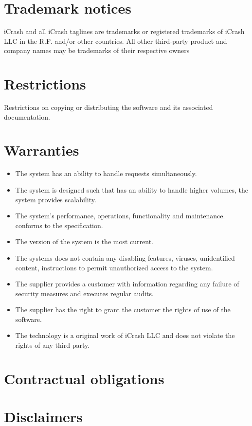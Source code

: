 \section{Trademark notices}
iCrash and all iCrash taglines are trademarks or registered trademarks of iCrash LLC in the R.F. and/or other countries. All other third-party product and company names may be trademarks of their respective owners


\section{Restrictions}
Restrictions on copying or distributing the software and its associated
documentation.

\section{Warranties}
\begin{itemize}
  \item The system has an ability to handle requests simultaneously.
  \item The system is designed such that has an ability to handle higher
  volumes, the system provides scalability.
  \item The system's performance, operations, functionality and maintenance.
  conforms to the specification.
  \item The version of the system is the most current.
  \item The systems does not contain any disabling features, viruses,
  unidentified content, instructions to permit unauthorized access to the system.
  \item The supplier provides a customer with information regarding any failure
  of security measures and executes regular audits.
  \item The supplier has the right to grant the customer the rights of use of
  the software.
  \item The technology is a original work of iCrash LLC and does not violate the
  rights of any third party.
\end{itemize}

\section{Contractual obligations}



\section{Disclaimers}


